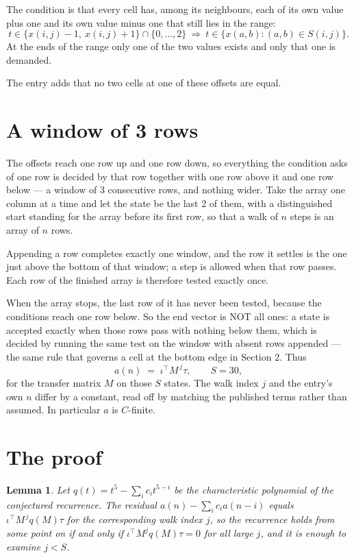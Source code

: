 \documentclass[11pt,a4paper]{article}
\theoremstyle{plain}
\newtheorem{lemma}[theorem]{Lemma}
\theoremstyle{definition}
\begin{document}
The condition is that every cell has, among its neighbours, each of its own value plus one and its own value minus one that still lies in the range:
\[
t\in\{x(i,j)-1,\ x(i,j)+1\}\cap\{0,\dots,2\}\ \Longrightarrow\ t\in\{x(a,b):(a,b)\in S(i,j)\}.
\]
At the ends of the range only one of the two values exists and only that one is demanded.

The entry adds that no two cells at one of these offsets are equal.

\section{A window of 3 rows}

The offsets reach one row up and one row down, so everything the condition asks of one row is
decided by that row together with one row above it and one row below --- a window of
$3$ consecutive rows, and nothing wider. Take the array one column at a time and
let the state be the last 2 of them, with a distinguished start standing for the array before its
first row, so that a walk of $n$ steps is an array of $n$ rows.

Appending a row completes exactly one window, and the row it settles is the one just above the bottom of that window; a step is
allowed when that row passes. Each row of the finished array is therefore tested exactly once.

When the array stops, the last row of it has never been tested, because the
conditions reach one row below. So the end vector is NOT all ones: a state is accepted exactly when
those rows pass with nothing below them, which is decided by running the same test on the window
with absent rows appended --- the same rule that governs a cell at the bottom edge in
Section 2.
Thus
\[
a(n)\;=\;\iota^{\!\top}M^{\,j}\tau ,\qquad S=30,
\]
for the transfer matrix $M$ on those $S$ states. The walk index $j$ and the entry's own $n$
differ by a constant, read off by matching the published terms rather than assumed. In
particular $a$ is $C$-finite.

\section{The proof}

\begin{lemma}\label{lem:crit}
Let $q(t)=t^{5}-\sum_i c_it^{5-i}$ be the characteristic polynomial of the
conjectured recurrence. The residual $a(n)-\sum_ic_ia(n-i)$ equals
$\iota^{\!\top}M^{\,j}q(M)\tau$ for the corresponding walk index $j$, so the recurrence
holds from some point on if and only if $\iota^{\!\top}M^{j}q(M)\tau=0$ for all large $j$,
and it is enough to examine $j<S$.
\end{lemma}
\end{document}
